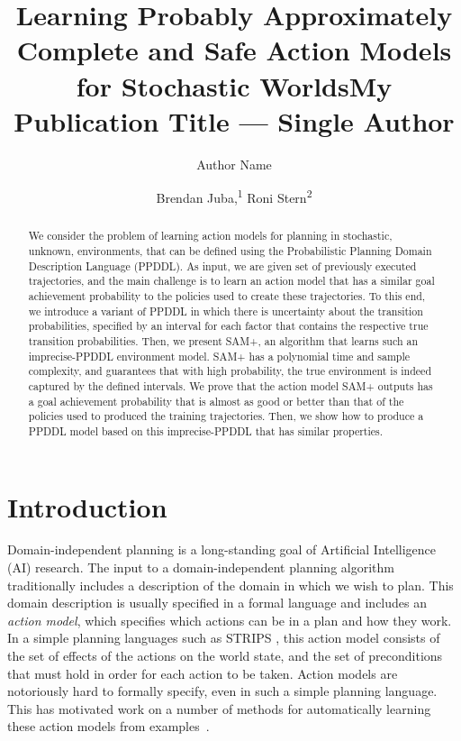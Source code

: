 \documentclass[letterpaper]{article} %
\title{Learning Probably  Approximately Complete and Safe Action Models for Stochastic Worlds}
\title{My Publication Title --- Single Author}
\author {
    Author Name
}
\author {
    Brendan Juba,\equalcontrib\textsuperscript{\rm 1}
    Roni Stern\equalcontrib\textsuperscript{\rm 2}
}
\begin{document}
\maketitle

\begin{abstract}
We consider the problem of learning action models for planning 
in stochastic, unknown, environments, that can be defined using the Probabilistic Planning Domain Description Language (PPDDL). 
As input, we are given set of previously executed trajectories, and the main challenge is to learn an action model that has a similar goal achievement probability to the policies used to create these trajectories. 
To this end, we introduce a variant of PPDDL in which there is uncertainty about the transition probabilities, specified by an interval for each factor that contains the respective true transition probabilities. 
Then, we present SAM+, an algorithm that learns such an imprecise-PPDDL environment model. 
SAM+ has a polynomial time and sample complexity, and guarantees that with high probability, the true environment is indeed captured by the defined intervals. 
We prove that the action model SAM+ outputs has a goal achievement probability that is almost as good or better than that of the policies used to produced the training trajectories.   
Then, we show how to produce a PPDDL model based on this imprecise-PPDDL that has similar properties. 
\end{abstract}

\section{Introduction}

Domain-independent planning is a long-standing goal of Artificial Intelligence (AI) research. 
The input to a domain-independent planning algorithm traditionally includes a description of the domain in which we wish to plan.
This domain description is usually specified in a formal language and includes an \emph{action model}, which specifies which actions can be in a plan and how they work. 
In a simple planning languages such as STRIPS \cite{fikes1971strips}, this action model consists of the set of effects of the actions on the world state, and the set of preconditions that must hold in order for each action to be taken. 
Action models are notoriously hard to formally specify, even in such a simple planning language. 
This has motivated work on a number of methods for automatically learning these action models from examples~\cite{yang2007learning,cresswell2011generalised,cresswell2013acquiring,zhuo2013action,stern2017efficientAndSafe,aineto19,juba2021kr}. 
\end{document}
